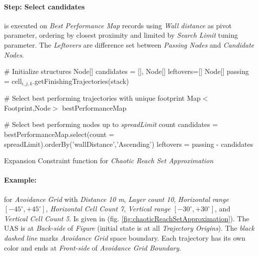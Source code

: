 \paragraph{Step: Select candidates} is executed on \emph{Best Performance Map} records using  \emph{Wall distance} as pivot parameter, ordering by closest proximity and limited by \emph{Search Limit} tuning parameter. The \emph{Leftovers} are difference set between \emph{Passing Nodes} and \emph{Candidate Nodes}. 

\begin{algorithm}[H]
    
    \BlankLine
    \# Initialize structures\;
    Node[] candidates = [], Node[] leftovers=[]\;
    Node[] passing = cell$_{i,j,k}$.getFinishingTrajectories(stack)\;
    
    \BlankLine
    \# Select best performing trajectories with unique footprint\;
    Map$<$Footprint,Node$>$  bestPerformanceMap\;
    \For{Node test $\in$ passing}{
        wallDistance= test.minimalDistanceToWall(cell$_{i,j,k}$)]\;
        footPrint = test.getFootprint(lastCells = footprintLength)\;
        \eIf{bestPerformanceMap.contains(footPrint)}{
            old = bestPerformanceMap.getByKey(footprint)\;
            oldPerformance= old.minimalDistanceToWall(cell$_{i,j,k}$)\;
            \If{oldPerformance $>$ wallDistance}{
                bestPerformanceMap.setByKey(footprint,test)\;         
            }
        }{
            bestPerformanceMap.setByKey(footprint,test)\;
        }
    }
    
    \BlankLine
    \# Select best performing nodes up to \emph{spreadLimit} count\;
    candidates = bestPerformanceMap.select(count = spreadLimit).orderBy('wallDistance','Ascending')\;
    leftovers = passing - candidates\;
    
    
    \caption{Expansion Constraint function for \emph{Chaotic Reach Set Approximation}}
    \label{alg:ExpansionConstraintFunctionForChaoticReachSet}
\end{algorithm}

\paragraph{Example:} for \emph{Avoidance Grid} with \emph{Distance 10 m}, \emph{Layer count 10}, \emph{Horizontal range $[-45^\circ,+45^\circ]$}, \emph{Horizontal Cell Count 7}, \emph{Vertical range $[-30^\circ,+30^\circ]$}, and \emph{Vertical Cell Count 5}. Is given in (fig. \ref{fig:chaoticReachSetApproximation}). The UAS is at \emph{Back-side} of \emph{Figure} (initial state is at all \emph{Trajectory Origins}). The \emph{black dashed line} marks \emph{Avoidance Grid} space boundary. Each trajectory has its own color and ends at \emph{Front-side} of \emph{Avoidance Grid Boundary}.


